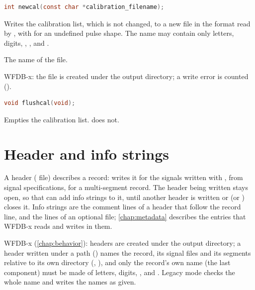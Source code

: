 \begin{lstlisting}[language=C,style=signature]
int newcal(const char *calibration_filename);
\end{lstlisting}
Writes the calibration list, which is not changed, to a new file in the
format read by , with  for an undefined pulse
shape. The name may contain only letters, digits, \code{\_},
\code{\textasciitilde}, \code{-} and \code{/}.
\begin{params}
\item[calibration\_filename] The name of the file.
\end{params}

WFDB-x: the file is created under the output directory; a write error is
counted ().

\begin{lstlisting}[language=C,style=signature]
void flushcal(void);
\end{lstlisting}
Empties the calibration list.  does not.

\section{Header and info strings}
\label{sec:library-header}

A header ( file) describes a record:  writes it
for the signals written with ,  from signal
specifications,  for a multi-segment record. The header
being written stays open, so that  can add info strings to it,
until another header is written or  (or
) closes it. Info strings are the comment lines of a header
that follow the record line, and the lines of an optional  file;
\cref{chap:metadata} describes the  entries that WFDB-x
reads and writes in them.

WFDB-x (\cref{chap:behavior}): headers are created under the output
directory; a header written under a path () names the record,
its signal files and its segments relative to its own directory
(, ), and only the record's own name (the last
component) must be made of letters, digits, \code{\_}, \code{-} and
\code{\textasciitilde}. Legacy mode checks the whole name and writes the
names as given.

